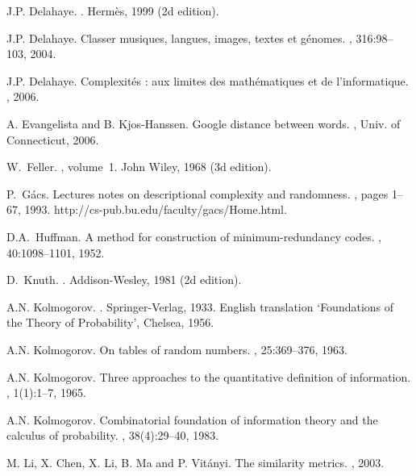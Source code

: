 \begin{thebibliography}{9}
J.P. Delahaye.
.
\newblock Herm{\`e}s, 1999 (2d edition).

J.P. Delahaye.
\newblock Classer musiques, langues, images, textes
              et g\'enomes.
, 316:98--103, 2004.

J.P. Delahaye.
\newblock Complexit\'es :
aux limites des math\'ematiques et de l'informatique.
, 2006.

A. Evangelista and B. Kjos-Hanssen.
\newblock Google distance between words.
,
Univ. of Connecticut, 2006.

W.~Feller.
,
volume~1.
\newblock John Wiley, 1968 (3d edition).

P.~G{\'a}cs.
\newblock Lectures notes on descriptional complexity and randomness.
, pages 1--67, 1993.
\newblock http://cs-pub.bu.edu/faculty/gacs/Home.html.

D.A.~Huffman.
\newblock A method for construction of minimum-redundancy codes.
,
40:1098--1101, 1952.

D.~Knuth.
.
\newblock Addison-Wesley, 1981 (2d edition).

A.N. Kolmogorov.
.
\newblock Springer-Verlag, 1933.
\newblock English translation {`}Foundations of the Theory of Probability{'},
  Chelsea, 1956.

A.N. Kolmogorov.
\newblock On tables of random numbers.
,
25:369--376, 1963.

A.N. Kolmogorov.
\newblock Three approaches to the quantitative definition of information.
, 1(1):1--7, 1965.

A.N. Kolmogorov.
\newblock Combinatorial foundation of information theory and the calculus of
  probability.
, 38(4):29--40, 1983.

M. Li, X. Chen, X. Li, B. Ma and P. Vit\'{a}nyi.
\newblock The similarity metrics.
,
2003.


\end{thebibliography}
